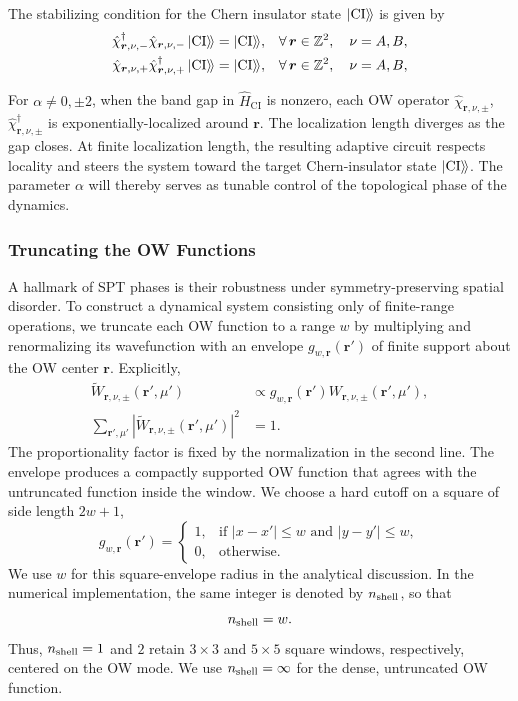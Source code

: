 \documentclass[aps,prb,twocolumn,superscriptaddress,longbibliography,floatfix]{revtex4-2}
\newcommand{\mr}[1]{\mathrm{#1}}
\newcommand{\bfr}{\boldsymbol r}
\newcommand{\kett}[1]{\ket{#1}\!\rangle}
\newcommand{\CI}{\kett{\mr{CI}}}
\theoremstyle{plain}
\theoremstyle{definition}
\theoremstyle{remark}
\begin{document}
The stabilizing condition for the Chern insulator state $\CI$ is given by
\begin{align}
    \hat\chi_{\bfr,\nu,-}^\dagger\hat\chi_{\bfr,\nu,-}\CI &= \CI,
    &&\forall\,\bfr\in\mathbb Z^2,\quad \nu=A,B,
    \label{eq:CIStabilizerCondition1}\\
    \hat\chi_{\bfr,\nu,+}\hat\chi^\dagger_{\bfr,\nu,+}\CI &= \CI,
    &&\forall\,\bfr\in\mathbb Z^2,\quad \nu=A,B,
    \label{eq:CIStabilizerCondition2}
\end{align}

For $\alpha\neq0,\pm2$, when the band gap in $\hat H_{\mr{CI}}$ is nonzero, each OW operator $\hat\chi_{\bfr,\nu,\pm}$, $\hat\chi^\dagger_{\bfr,\nu,\pm}$ is exponentially-localized around $\bfr$. The localization length diverges as the gap closes. At finite localization length, the resulting adaptive circuit respects locality and steers the system toward the target Chern-insulator state $\CI$. The parameter $\alpha$ will thereby serves as tunable control of the topological phase of the dynamics.

\subsubsection{Truncating the OW Functions}
A hallmark of SPT phases is their robustness under symmetry-preserving spatial disorder. To construct a dynamical system consisting only of finite-range operations, we truncate each OW function to a range $w$ by multiplying and renormalizing its wavefunction with an envelope $g_{w,\bfr}(\bfr')$ of finite support about the OW center $\bfr$. Explicitly,
\begin{align}
    \widetilde{W}_{\bfr,\nu,\pm}(\bfr',\mu')
    &\propto
    g_{w,\bfr}(\bfr')W_{\bfr,\nu,\pm}(\bfr',\mu'),
    \label{eq:TruncatedOWWavefunction}\\
    \sum_{\bfr',\mu'}
    \left|\widetilde{W}_{\bfr,\nu,\pm}(\bfr',\mu')\right|^2
    &=1.
    \label{eq:NormalizedTruncatedOWWavefunction}
\end{align}
The proportionality factor is fixed by the normalization in the second line. The envelope produces a compactly supported OW function that agrees with the untruncated function inside the window. We choose a hard cutoff on a square of side length $2w+1$,
\begin{equation}
    g_{w,\bfr}(\bfr')=
    \begin{cases}
        1,&\text{if }|x-x'|\leq w\text{ and }|y-y'|\leq w,\\
        0,&\text{otherwise.}
    \end{cases}
    \label{eq:SquareOWEnvelope}
\end{equation}
We use $w$ for this square-envelope radius in the analytical discussion. In
the numerical implementation, the same integer is denoted by
$n_{\rm shell}$, so that
\begin{equation}
    n_{\rm shell}=w.
    \label{eq:NShellOWWidth}
\end{equation}
Thus, $n_{\rm shell}=1$ and $2$ retain $3\times3$ and $5\times5$ square
windows, respectively, centered on the OW mode. We use
$n_{\rm shell}=\infty$ for the dense, untruncated OW function.
\end{document}
